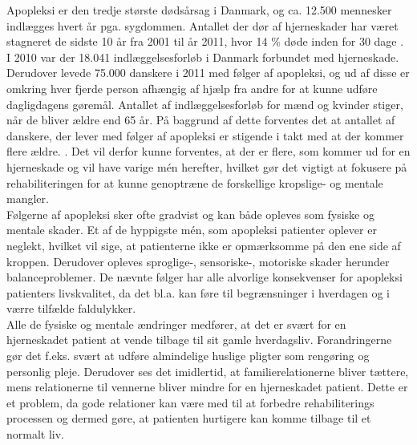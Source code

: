 Apopleksi er den tredje største dødsårsag i Danmark, og ca. 12.500 mennesker indlægges hvert år pga. sygdommen\cite{Hjernesagen2015a}. Antallet der dør af hjerneskader har været stagneret de sidste 10 år fra 2001 til år 2011, hvor 14 \% døde inden for 30 dage \cite{Hjernesagen2015}. I 2010 var der 18.041 indlæggelsesforløb i Danmark forbundet med hjerneskade\cite{Sundhedsstyrelsen2011}. Derudover levede 75.000 danskere i 2011 med følger af apopleksi, og ud af disse er omkring hver fjerde person afhængig af hjælp fra andre for at kunne udføre dagligdagens gøremål\cite{Hjernesagen2015a}. Antallet af indlæggelsesforløb for mænd og kvinder stiger, når de bliver ældre end 65 år\cite{Sundhedsstyrelsen2011}.%
På baggrund af dette forventes det at antallet af danskere, der lever med følger af apopleksi er stigende i takt med at der kommer flere ældre. \cite{Sagen2014}. 
Det vil derfor kunne forventes, at der er flere, som kommer ud for en hjerneskade og vil have varige mén herefter, hvilket gør det vigtigt at fokusere på rehabiliteringen for at kunne genoptræne de forskellige kropslige- og mentale mangler. \\
Følgerne af apopleksi sker ofte gradvist og kan både opleves som fysiske og mentale skader\cite{Muus2008}. Et af de hyppigste mén, som apopleksi patienter oplever er neglekt, hvilket vil sige, at patienterne ikke er opmærksomme på den ene side af kroppen\cite{Sundhed.dk}. Derudover opleves sproglige-, sensoriske-, motoriske skader herunder balanceproblemer. De nævnte følger har alle alvorlige konsekvenser for apopleksi patienters livskvalitet, da det bl.a. kan føre til  begrænsninger i hverdagen og i værre tilfælde faldulykker.\cite{Nichols1997, Muus2008} \\
Alle de fysiske og mentale ændringer medfører, at det er svært for en hjerneskadet patient at vende tilbage til sit gamle hverdagsliv. Forandringerne gør det f.eks. svært at udføre almindelige huslige pligter som rengøring og personlig pleje. Derudover ses det imidlertid, at familierelationerne bliver tættere, mens relationerne til vennerne bliver mindre for en hjerneskadet patient. Dette er et problem, da gode relationer kan være med til at forbedre rehabiliterings processen og dermed gøre, at patienten hurtigere kan komme tilbage til et normalt liv.\cite{Sundhedsstyrelsen2010} \\
